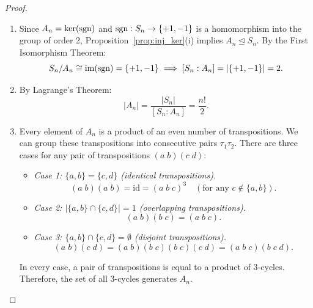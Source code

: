 \begin{proof}
\begin{enumerate}[label=\textbf{(\roman*)}, leftmargin=*, itemsep=8pt]
    \item Since $A_n = \ker(\operatorname{sgn})$ and $\operatorname{sgn}: S_n \to \{+1, -1\}$ is a homomorphism into the group of order 2, Proposition~\ref{prop:inj_ker}(i) implies $A_n \trianglelefteq S_n$.
    By the First Isomorphism Theorem:
    \begin{equation*}
    S_n/A_n \cong \operatorname{im}(\operatorname{sgn}) = \{+1, -1\} \implies [S_n : A_n] = |\{+1, -1\}| = 2.
    \end{equation*}

    \item By Lagrange's Theorem:
    \begin{equation*}
    |A_n| = \frac{|S_n|}{[S_n : A_n]} = \frac{n!}{2}.
    \end{equation*}

    \item Every element of $A_n$ is a product of an even number of transpositions.
    We can group these transpositions into consecutive pairs $\tau_1 \tau_2$.
    There are three cases for any pair of transpositions $(a \; b)(c \; d)$:
    \begin{itemize}[leftmargin=1.5em, itemsep=4pt]
        \item \emph{Case 1: $\{a, b\} = \{c, d\}$ (identical transpositions).}
        \begin{equation*}
        (a \; b)(a \; b) = \text{id} = (a \; b \; c)^3 \quad (\text{for any } c \notin \{a, b\}).
        \end{equation*}
        \item \emph{Case 2: $|\{a, b\} \cap \{c, d\}| = 1$ (overlapping transpositions).}
        \begin{equation*}
        (a \; b)(b \; c) = (a \; b \; c).
        \end{equation*}
        \item \emph{Case 3: $\{a, b\} \cap \{c, d\} = \emptyset$ (disjoint transpositions).}
        \begin{equation*}
        (a \; b)(c \; d) = (a \; b)(b \; c)(b \; c)(c \; d) = (a \; b \; c)(b \; c \; d).
        \end{equation*}
    \end{itemize}
    In every case, a pair of transpositions is equal to a product of 3-cycles.
    Therefore, the set of all 3-cycles generates $A_n$.
\end{enumerate}
\end{proof}

